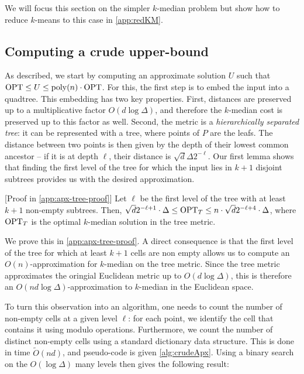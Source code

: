 We will focus this section on the simpler $k$-median problem but show how to reduce $k$-means to this case in \cref{app:redKM}.

\subsection{Computing a crude upper-bound}
\label{ssec:crude_bound}

As described, we start by computing an approximate solution $U$ such that $\text{OPT} \leq U \leq \operatorname{poly}(n) \cdot \text{OPT}$. For this, the first step is to embed the input
into a quadtree. This embedding has two key properties. First, distances are preserved up to a multiplicative factor $O(d \log \Delta)$, and therefore the
$k$-median cost is preserved up to this factor as well. Second, the metric is a \emph{hierarchically separated tree}: it can be represented with a tree, where
points of $P$ are the leafs. The distance between two points is then given by the depth of their lowest common ancestor -- if it is at depth $\ell$, their distance
is $\sqrt{d} \Delta 2^{-\ell}$.  Our first lemma shows that finding the first level of the tree for which the input lies in $k+1$ disjoint subtrees provides us
with the desired approximation. 

\begin{lemma}\label{lem:apxTree} [Proof in \cref{app:apx-tree-proof}]
Let $\ell$ be the first level of the tree with at least $k+1$ non-empty subtrees. Then, $\sqrt{d}2^{-\ell+1} \cdot \Delta \leq
\text{OPT}_T \leq n \cdot \sqrt{d}2^{-\ell+4} \cdot \Delta$, where $\text{OPT}_T$ is the optimal $k$-median solution in the tree metric.

\end{lemma}

We prove this in \cref{app:apx-tree-proof}. A direct consequence  is that the first level of the tree for which at least $k+1$ cells are non empty allows us to
compute an $O(n)$-approximation for $k$-median on the tree metric. Since the tree metric approximates the oringial Euclidean metric up to $O(d \log
\Delta)$, this is therefore an $O(n d \log \Delta)$-approximation to $k$-median in the Euclidean space.

To turn this observation into an algorithm, one needs to count the number of non-empty cells at a given level $\ell$: for each point, we identify the cell that
contains it using modulo operations. Furthermore, we count the number of distinct non-empty cells using a standard dictionary data structure. This is done in
time $\tilde O(nd)$, and pseudo-code is given \cref{alg:crudeApx}. Using a binary search on the $O(\log \Delta)$ many levels then gives the following result:

